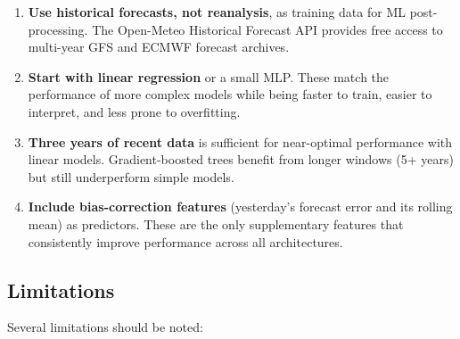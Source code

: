 \documentclass{ametsocV6.1}
\begin{document}
\begin{enumerate}
  \item \textbf{Use historical forecasts, not reanalysis}, as training data for ML
    post-processing. The Open-Meteo Historical Forecast API provides free access to
    multi-year GFS and ECMWF forecast archives.
  \item \textbf{Start with linear regression} or a small MLP. These match the
    performance of more complex models while being faster to train, easier to
    interpret, and less prone to overfitting.
  \item \textbf{Three years of recent data} is sufficient for near-optimal
    performance with linear models. Gradient-boosted trees benefit from longer
    windows (5+ years) but still underperform simple models.
  \item \textbf{Include bias-correction features} (yesterday's forecast error and
    its rolling mean) as predictors. These are the only supplementary features that
    consistently improve performance across all architectures.
\end{enumerate}

\subsection{Limitations}
\label{sec:limitations}

Several limitations should be noted:
\end{document}

